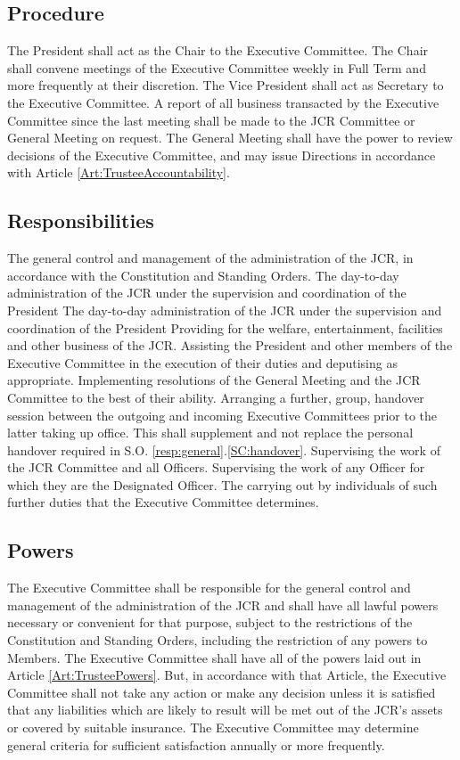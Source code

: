\subsection{Procedure}
\npara The President shall act as the Chair to the Executive Committee.
\npara The Chair shall convene meetings of the Executive Committee weekly in Full Term and more frequently at their discretion.
\npara The Vice President shall act as Secretary to the Executive Committee.
\npara \label{SO:BusinessReport} A report of all business transacted by the Executive Committee since the last meeting shall be made to the JCR Committee or General Meeting on request.
\npara The General Meeting shall have the power to review decisions of the Executive Committee, and may issue Directions in accordance with Article \ref{Art:TrusteeAccountability}.
\subsection{Responsibilities}
\npara The general control and management of the administration of the JCR, in accordance with the Constitution and Standing Orders.
\npara The day-to-day administration of the JCR under the supervision and coordination of the President
\npara The day-to-day administration of the JCR under the supervision and coordination of the President
\npara Providing for the welfare, entertainment, facilities and other business of the JCR.
\npara Assisting the President and other members of the Executive Committee in the execution of their duties and deputising as appropriate.
\npara Implementing resolutions of the General Meeting and the JCR Committee to the best of their ability.
\npara Arranging a further, group, handover session between the outgoing and incoming Executive Committees prior to the latter taking up office. This shall supplement and not replace the personal handover required in S.O. \ref{resp:general}.\ref{SC:handover}.
\npara Supervising the work of the JCR Committee and all Officers.
\npara Supervising the work of any Officer for which they are the Designated Officer.
\npara The carrying out by individuals of such further duties that the Executive Committee determines.
\subsection{Powers}
\npara The Executive Committee shall be responsible for the general control and management of the administration of the JCR and shall have all lawful powers necessary or convenient for that purpose, subject to the restrictions of the Constitution and Standing Orders, including the restriction of any powers to Members.
\npara The Executive Committee shall have all of the powers laid out in Article \ref{Art:TrusteePowers}.
But, in accordance with that Article, the Executive Committee shall not take any action or make any decision unless it is satisfied that any liabilities which are likely to result will be met out of the JCR's assets or covered by suitable insurance.
The Executive Committee may determine general criteria for sufficient satisfaction annually or more frequently.
